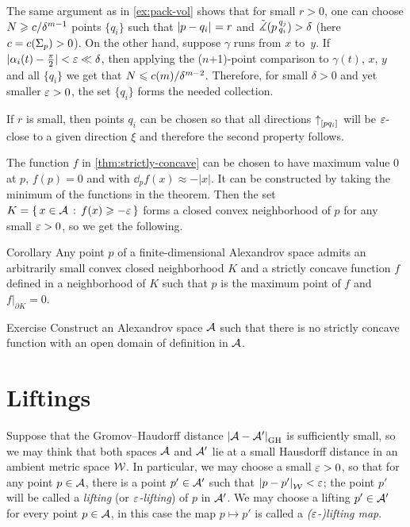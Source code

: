 The same argument as in \ref{ex:pack-vol} shows that for small $r>0$, one can
choose $N\geqslant c/\delta^{m-1}$ points $\{q_i\}$ such that $|{p}-{q_i}|_{}^{{}}=r$
and $\tilde\measuredangle(p\,{}^{q_j}_{q_i})>\delta$ (here $c=c(\Sigma_p)>0$).
On the other hand, suppose $\gamma$ runs from $x$ to~$y$.
If $|\alpha_i(t)- \tfrac\pi2|<\varepsilon\ll\delta$, then applying the ($n$+1)-point comparison to $\gamma(t)$, $x$, $y$ and all $\{q_i\}$ we get that
$N\leqslant c(m)/\delta^{m-2}$. 
Therefore, for small $\delta>0$ and yet smaller $\varepsilon>0$, the set $\{q_i\}$ forms the needed collection.

If $r$ is small, then points $q_i$ can be chosen so that all directions
${\uparrow}_{[{p}{q_i}]_{{}}}$ will be $\varepsilon$-close to a given direction $\xi$ and
therefore the second property follows.
\qeds

The function $f$ in \ref{thm:strictly-concave} can be chosen to have maximum value $0$ at $p$,
$f(p)=0$ and with $\dd_p f(x)\approx-|x|$.
It can be constructed by taking the minimum of the functions in the theorem.
Then the set $K=\left\{\,{x\in\mathcal{A}}\,:\,{f(x)\geqslant -\varepsilon}\,\right\}$ forms a closed convex neighborhood of $p$ for any small $\varepsilon>0$, so we get the following.


\begin{thm}{Corollary}\label{cor:convex-nbhd}
Any point $p$ of a finite-dimensional Alexandrov space admits an arbitrarily small convex closed neighborhood $K$ and a strictly concave function $f$ defined in a neighborhood of $K$ such that $p$ is the maximum point of $f$
and $f|_{\partial K}=0$.
\end{thm}

\begin{thm}{Exercise}\label{ex:no-conc}
Construct an Alexandrov space $\mathcal{A}$ such that there is no strictly concave function with an open domain of definition in $\mathcal{A}$.
\end{thm}


\section{Liftings}

Suppose that the Gromov--Haudorff distance $|{\mathcal{A}}-{\mathcal{A}'}|_{\operatorname{\rm GH}\nolimits}^{{}}$ is sufficiently small, so we may think that both spaces $\mathcal{A}$ and $\mathcal{A}'$ lie at a small Hausdorff distance in an ambient metric space $\mathcal{W}$.
In particular, we may choose a small $\varepsilon>0$, so that for any point $p\in \mathcal{A}$, there is a point $p'\in \mathcal{A}'$ such that $|{p}-{p'}|_{\mathcal{W}}^{{}}<\varepsilon$;
the point $p'$ will be called a \emph{lifting} (or \emph{$\varepsilon$-lifting}) of $p$ in $\mathcal{A}'$.
We may choose a lifting $p'\in\mathcal{A}'$ for every point $p\in\mathcal{A}$, 
in this case the map $p\mapsto p'$ is called a {}\emph{($\varepsilon$-)lifting map}.

